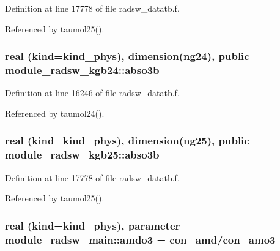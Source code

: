 Definition at line 17778 of file radsw\+\_\+datatb.\+f.



Referenced by taumol25().

\subsubsection[{\texorpdfstring{abso3b}{abso3b}}]{\setlength{\rightskip}{0pt plus 5cm}real (kind=kind\+\_\+phys), dimension(ng24), public module\+\_\+radsw\+\_\+kgb24\+::abso3b}\hypertarget{group__module__radsw__main_ga6b44aa0637523aa1f78de5b4d16c693b}{}\label{group__module__radsw__main_ga6b44aa0637523aa1f78de5b4d16c693b}


Definition at line 16246 of file radsw\+\_\+datatb.\+f.



Referenced by taumol24().

\subsubsection[{\texorpdfstring{abso3b}{abso3b}}]{\setlength{\rightskip}{0pt plus 5cm}real (kind=kind\+\_\+phys), dimension(ng25), public module\+\_\+radsw\+\_\+kgb25\+::abso3b}\hypertarget{group__module__radsw__main_ga2844cade392c8805b1d418bc1260b3a5}{}\label{group__module__radsw__main_ga2844cade392c8805b1d418bc1260b3a5}


Definition at line 17778 of file radsw\+\_\+datatb.\+f.



Referenced by taumol25().

\subsubsection[{\texorpdfstring{amdo3}{amdo3}}]{\setlength{\rightskip}{0pt plus 5cm}real (kind=kind\+\_\+phys), parameter module\+\_\+radsw\+\_\+main\+::amdo3 = con\+\_\+amd/con\+\_\+amo3\hspace{0.3cm}{\ttfamily [private]}}\hypertarget{group__module__radsw__main_ga527e5e1cec6ad0800f69a606fde77369}{}\label{group__module__radsw__main_ga527e5e1cec6ad0800f69a606fde77369}


